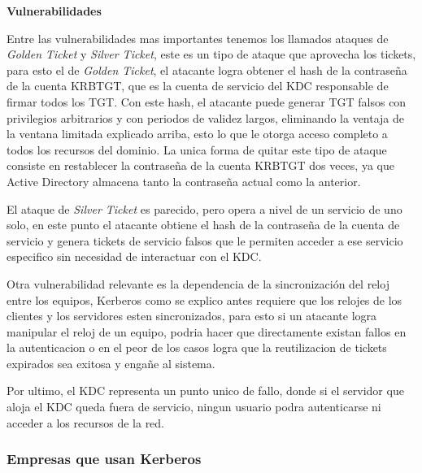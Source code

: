 \documentclass[letterpaper,12pt]{article}
\begin{document}
\textbf{Vulnerabilidades}

Entre las vulnerabilidades mas importantes tenemos los llamados ataques de \textit{Golden Ticket} y 
\textit{Silver Ticket}, este es un tipo de ataque que aprovecha los tickets, para esto el de \textit{Golden Ticket}, 
el atacante logra obtener el hash de la contraseña de la cuenta KRBTGT, que es la cuenta de servicio del KDC 
responsable de firmar todos los TGT. Con este hash, el atacante puede generar TGT falsos con 
privilegios arbitrarios y con periodos de validez largos, eliminando la ventaja de la ventana limitada explicado arriba,
esto lo que le otorga acceso completo a todos los recursos del dominio.
La unica forma de quitar este tipo de ataque consiste en restablecer la contraseña de la cuenta
KRBTGT dos veces, ya que Active Directory almacena tanto la contraseña actual como la anterior.

El ataque de \textit{Silver Ticket} es parecido, pero opera a nivel de un servicio de uno solo, en este punto 
el atacante obtiene el hash de la contrase\~na de la cuenta de servicio y genera tickets de servicio falsos 
que le permiten acceder a ese servicio especifico sin necesidad de interactuar con el KDC.

Otra vulnerabilidad relevante es la dependencia de la sincronizaci\'on del reloj entre los equipos, Kerberos como se explico antes
requiere que los relojes de los clientes y los servidores esten sincronizados, para esto si 
un atacante logra manipular el reloj de un equipo, podria hacer que directamente existan fallos en la 
autenticacion o en el peor de los casos logra que la reutilizacion de tickets expirados sea exitosa y engañe al sistema.

Por ultimo, el KDC representa un punto unico de fallo, donde si el servidor que aloja el KDC 
queda fuera de servicio, ningun usuario podra autenticarse ni acceder a los recursos de la red. 

\subsubsection{Empresas que usan Kerberos}
\end{document}
